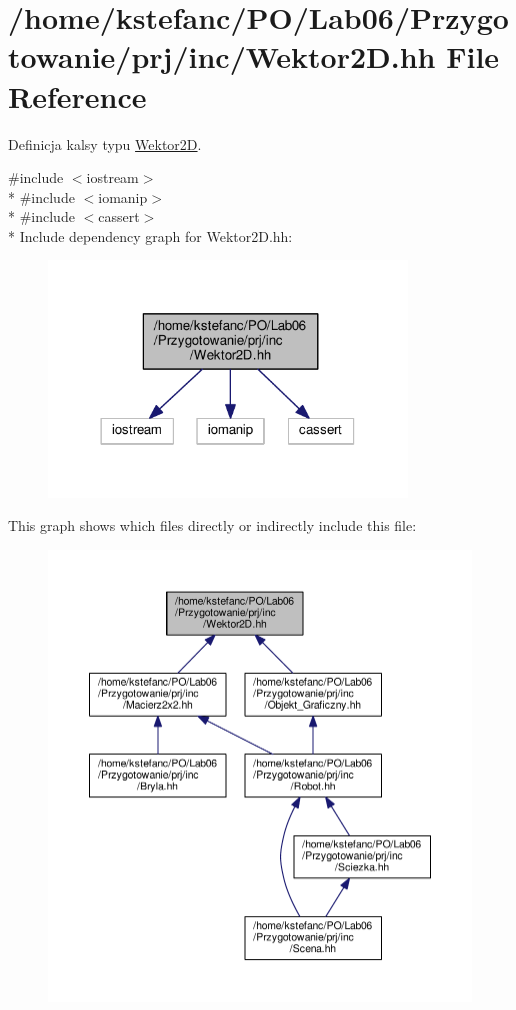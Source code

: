 \hypertarget{_wektor2_d_8hh}{\section{/home/kstefanc/\+P\+O/\+Lab06/\+Przygotowanie/prj/inc/\+Wektor2\+D.hh File Reference}
\label{_wektor2_d_8hh}
}


Definicja kalsy typu \hyperlink{class_wektor2_d}{Wektor2\+D}.  


{\ttfamily \#include $<$iostream$>$}\\*
{\ttfamily \#include $<$iomanip$>$}\\*
{\ttfamily \#include $<$cassert$>$}\\*
Include dependency graph for Wektor2\+D.\+hh\+:\nopagebreak
\begin{figure}[H]
\begin{center}
\leavevmode
\includegraphics[width=270pt]{_wektor2_d_8hh__incl}
\end{center}
\end{figure}
This graph shows which files directly or indirectly include this file\+:
\nopagebreak
\begin{figure}[H]
\begin{center}
\leavevmode
\includegraphics[width=350pt]{_wektor2_d_8hh__dep__incl}
\end{center}
\end{figure}
